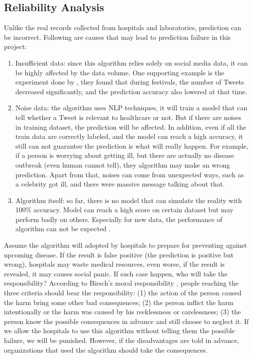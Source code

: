 \subsection{Reliability Analysis}
Unlike the real records collected from hospitals and laboratories, prediction can be incorrect. Following are causes that may lead to prediction failure in this project:
\begin{enumerate}
    \item Insufficient data: since this algorithm relies solely on social media data, it can be highly affected by the data volume. One supporting example is the experiment done by \cite{elkin2017network}, they found that during festivals, the number of Tweets decreased significantly, and the prediction accuracy also lowered at that time. 
    \item Noise data: the algorithm uses NLP techniques, it will train a model that can tell whether a Tweet is relevant to healthcare or not. But if there are noises in training dataset, the prediction will be affected. In addition, even if all the train data are correctly labeled, and the model can reach a high accuracy, it still can not guarantee the prediction is what will really happen. For example, if a person is worrying about getting ill, but there are actually no disease outbreak (even human cannot tell), they algorithm may make an wrong prediction. Apart from that, noises can come from unexpected ways, such as a celebrity got ill, and there were massive message talking about that\cite{schmidt2012trending}. 
    \item Algorithm itself: so far, there is no model that can simulate the reality with 100\% accuracy. Model can reach a high score on certain dataset but may perform badly on others. Especially for new data, the performance of algorithm can not be expected \cite{andreu2015big}.
\end{enumerate}
Assume the algorithm will adopted by hospitals to prepare for preventing against upcoming disease. If the result is false positive (the prediction is positive but wrong), hospitals may waste medical resources, even worse, if the result is revealed, it may causes social panic. If such case happen, who will take the responsibility? According to Birsch's moral responsibility \cite{birsch2004moral}, people reaching the three criteria should bear the responsibility: (1) the action of the person caused the harm bring some other bad consequences; (2) the person inflict the harm intentionally or the harm was caused by his recklessness or carelessness; (3) the person know the possible consequences in advance and still choose to neglect it. If we allow the hospitals to use this algorithm without telling them the possible failure, we will be punished. However, if the disadvantages are told in advance, organizations that used the algorithm should take the consequences.
